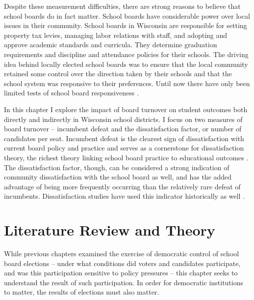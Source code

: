 Despite these measurement difficulties, there are strong reasons to believe that 
school boards do in fact matter. School boards have considerable power over 
local issues in their community. School boards in Wisconsin are responsible for 
setting property tax levies, managing labor relations with staff, and adopting 
and approve academic standards and curricula. They 
determine graduation requirements and discipline and attendance policies for 
their schools. The driving idea behind locally elected school boards 
was to ensure that the local community retained some control over the direction 
taken by their schools and that the school system was responsive to their 
preferences. Until now there have only been limited tests of school board 
responsiveness \citep{RefWorks:345}. 

In this chapter I explore the impact of board turnover on student outcomes both 
directly and indirectly in Wisconsin school districts. I focus on two measures 
of board turnover -- incumbent defeat and the dissatisfaction factor, or number 
of candidates per seat. 
Incumbent defeat is the clearest sign of dissatisfaction with current board policy 
and practice and serves as a cornerstone for dissatisfaction theory, the richest 
theory linking school board practice to educational outcomes \citep{RefWorks:297,RefWorks:245}. The dissatisfaction factor, though, can be considered a strong 
indication of community dissatisfaction with the school board as well, and has 
the added advantage of being more frequently occurring than the relatively rare 
defeat of incumbents. Dissatisfaction studies have used this indicator 
historically as well \citep{RefWorks:247,RefWorks:282,RefWorks:245}. 



\section{Literature Review and Theory}

While previous chapters examined the exercise of democratic control 
of school board elections -- under what conditions did voters and candidates 
participate, and was this participation sensitive to policy pressures -- this 
chapter seeks to understand the result of such participation. In order for 
democratic institutions to matter, the results of elections must also matter. 

